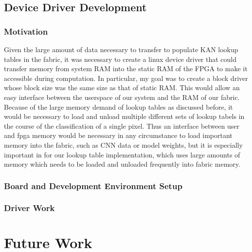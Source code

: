 \documentclass{article}
\begin{document}
\subsection{Device Driver Development}

\subsubsection{Motivation}
Given the large amount of data necessary to transfer to populate KAN lookup tables in the fabric, it was necessary to create a linux device driver that could transfer memory from system RAM into the static RAM of the FPGA to make it accessible during computation. In particular, my goal was to create a block driver whose block size was the same size as that of static RAM. This would allow an easy interface between the userspace of our system and the RAM of our fabric. Because of the large memory demand of lookup tables as discussed before, it would be necessary to load and unload multiple different sets of lookup tabels in the course of the classification of a single pixel. Thus an interface between user and fpga memory would be necessary in any circumstance to load important memory into the fabric, such as CNN data or model weights, but it is especially important in for our lookup table implementation, which uses large amounts of memory which needs to be loaded and unloaded frequently into fabric memory.  %



\subsubsection{Board and Development Environment Setup}

\subsubsection{Driver Work} %


\section{Future Work}
\end{document}
